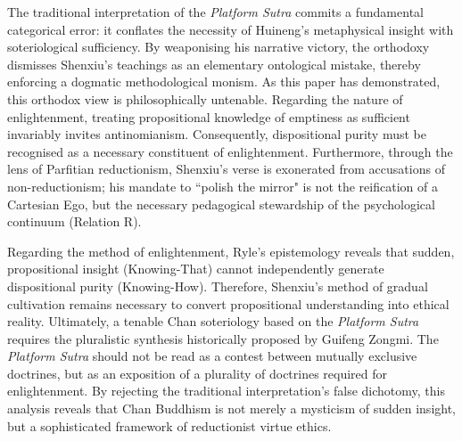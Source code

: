 The traditional interpretation of the \emph{Platform Sutra} commits a
fundamental categorical error: it conflates the necessity of Huineng's
metaphysical insight with soteriological sufficiency. By weaponising his
narrative victory, the orthodoxy dismisses Shenxiu's teachings as an
elementary ontological mistake, thereby enforcing a dogmatic
methodological monism. As this paper has demonstrated, this orthodox
view is philosophically untenable. Regarding the nature of
enlightenment, treating propositional knowledge of emptiness as
sufficient invariably invites antinomianism. Consequently, dispositional
purity must be recognised as a necessary constituent of enlightenment.
Furthermore, through the lens of Parfitian reductionism, Shenxiu's verse
is exonerated from accusations of non-reductionism; his mandate to
``polish the mirror" is not the reification of a Cartesian Ego, but the
necessary pedagogical stewardship of the psychological continuum
(Relation R).

Regarding the method of enlightenment, Ryle's epistemology reveals that
sudden, propositional insight (Knowing-That) cannot independently
generate dispositional purity (Knowing-How). Therefore, Shenxiu's method
of gradual cultivation remains necessary to convert propositional
understanding into ethical reality. Ultimately, a tenable Chan
soteriology based on the \emph{Platform Sutra} requires the pluralistic
synthesis historically proposed by Guifeng Zongmi. The \emph{Platform
Sutra} should not be read as a contest between mutually exclusive
doctrines, but as an exposition of a plurality of doctrines required for
enlightenment. By rejecting the traditional interpretation's false
dichotomy, this analysis reveals that Chan Buddhism is not merely a
mysticism of sudden insight, but a sophisticated framework of
reductionist virtue ethics.


